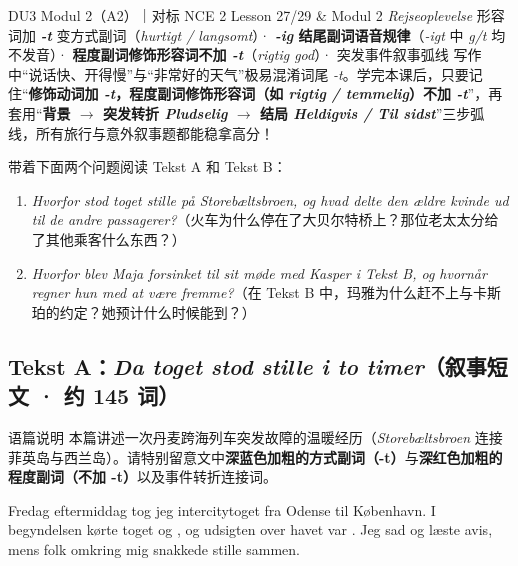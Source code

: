 {DU3 Modul 2（A2）｜对标 NCE 2 Lesson 27/29 \& Modul 2 \textit{Rejseoplevelse}}
{形容词加 \textbf{\textit{-t}} 变方式副词（\textit{hurtigt / langsomt}）· \textbf{\textit{-ig} 结尾副词语音规律}（\textit{-igt} 中 \textit{g/t} 均不发音）· \textbf{程度副词修饰形容词不加 \textit{-t}}（\textit{rigtig god}）· 突发事件叙事弧线}
{写作中“说话快、开得慢”与“非常好的天气”极易混淆词尾 \textit{-t}。学完本课后，只要记住“\textbf{修饰动词加 \textit{-t}，程度副词修饰形容词（如 \textit{rigtig / temmelig}）不加 \textit{-t}}”，再套用“\textbf{背景 $\rightarrow$ 突发转折 \textit{Pludselig} $\rightarrow$ 结局 \textit{Heldigvis / Til sidst}}”三步弧线，所有旅行与意外叙事题都能稳拿高分！}

\begin{foerduleaeser}
带着下面两个问题阅读 Tekst A 和 Tekst B：
\begin{enumerate}
  \item \textit{Hvorfor stod toget stille på Storebæltsbroen, og hvad delte den ældre kvinde ud til de andre passagerer?}（火车为什么停在了大贝尔特桥上？那位老太太分给了其他乘客什么东西？）
  \item \textit{Hvorfor blev Maja forsinket til sit møde med Kasper i Tekst B, og hvornår regner hun med at være fremme?}（在 Tekst B 中，玛雅为什么赶不上与卡斯珀的约定？她预计什么时候能到？）
\end{enumerate}
\end{foerduleaeser}


\subsection*{Tekst A：\textit{Da toget stod stille i to timer}（叙事短文 · 约 145 词）}

\begin{tipbox}{语篇说明}
本篇讲述一次丹麦跨海列车突发故障的温暖经历（\textit{Storebæltsbroen} 连接菲英岛与西兰岛）。请特别留意文中\textbf{\color{NCDNavy}深蓝色加粗的方式副词（-t）}与\textbf{\color{NCDRed}深红色加粗的程度副词（不加 -t）}以及事件转折连接词。
\end{tipbox}

Fredag eftermiddag tog jeg intercitytoget fra Odense til København. I begyndelsen kørte toget  og , og udsigten over havet var . Jeg sad og læste avis, mens folk omkring mig snakkede stille sammen.

